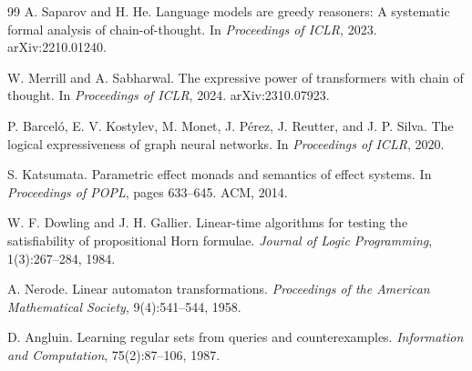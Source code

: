 \documentclass[10pt]{article}
\begin{document}
\begin{thebibliography}{99}
A. Saparov and H. He.
Language models are greedy reasoners: A systematic formal analysis of chain-of-thought.
In \emph{Proceedings of ICLR}, 2023. arXiv:2210.01240.

W. Merrill and A. Sabharwal.
The expressive power of transformers with chain of thought.
In \emph{Proceedings of ICLR}, 2024. arXiv:2310.07923.

P. Barcel\'o, E. V. Kostylev, M. Monet, J. P\'erez, J. Reutter, and J. P. Silva.
The logical expressiveness of graph neural networks.
In \emph{Proceedings of ICLR}, 2020.

S. Katsumata.
Parametric effect monads and semantics of effect systems.
In \emph{Proceedings of POPL}, pages 633--645. ACM, 2014.

W. F. Dowling and J. H. Gallier.
Linear-time algorithms for testing the satisfiability of propositional Horn formulae.
\emph{Journal of Logic Programming}, 1(3):267--284, 1984.

A. Nerode.
Linear automaton transformations.
\emph{Proceedings of the American Mathematical Society}, 9(4):541--544, 1958.

D. Angluin.
Learning regular sets from queries and counterexamples.
\emph{Information and Computation}, 75(2):87--106, 1987.
\end{thebibliography}
\end{document}
